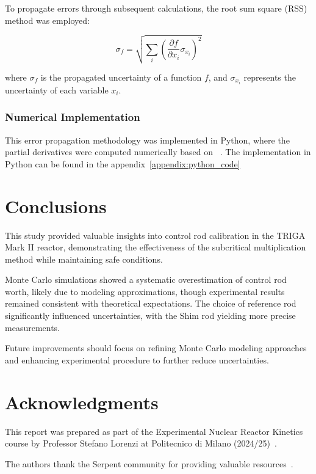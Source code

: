 To propagate errors through subsequent calculations, the root sum square (RSS) method was employed:

\begin{equation}
\sigma_f = \sqrt{\sum_{i} \left( \frac{\partial f}{\partial x_i} \sigma_{x_i} \right)^2}
\end{equation}

where $\sigma_f$ is the propagated uncertainty of a function $f$, and $\sigma_{x_i}$ represents the uncertainty of each variable $x_i$.

\subsubsection{Numerical Implementation}

This error propagation methodology was implemented in Python, where the partial derivatives were computed numerically based on ~\cite{Moffat1988}. 
The implementation in Python can be found in the appendix~\ref{appendix:python_code}

\section{Conclusions}
This study provided valuable insights into control rod calibration in the TRIGA Mark II reactor, 
demonstrating the effectiveness of the subcritical multiplication method while maintaining safe conditions. 

Monte Carlo simulations showed a systematic overestimation of control rod worth, likely due to modeling approximations, 
though experimental results remained consistent with theoretical expectations. 
The choice of reference rod significantly influenced uncertainties, with the Shim rod yielding more precise measurements. 

Future improvements should focus on refining Monte Carlo modeling approaches and enhancing experimental procedure to further reduce uncertainties.

\section*{Acknowledgments}
This report was prepared as part of the Experimental Nuclear Reactor Kinetics course by Professor Stefano Lorenzi at Politecnico di Milano (2024/25)~\parencite{Lorenzi2024}.

The authors thank the Serpent community for providing valuable resources~\parencite{SerpentWiki, SerpentForum}. 

